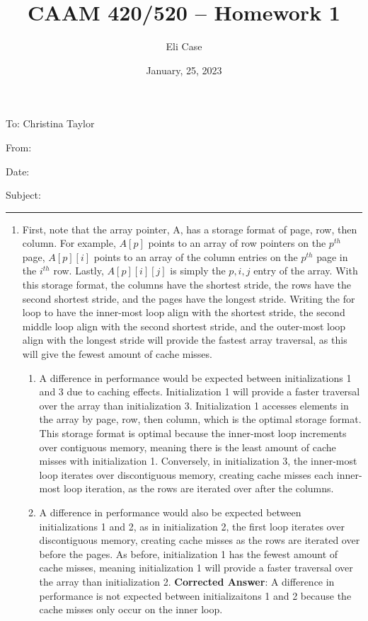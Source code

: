 \documentclass[11pt]{article}
\author{Eli Case}
\title{CAAM 420/520 -- Homework 1}
\date{January, 25, 2023}
\begin{document}
\flushleft
\thispagestyle{plain}
To: Christina Taylor

From: \@author

Date: \@date

Subject: \@title

\makeatother
\medskip
\hrule
\medskip

\begin{enumerate}[leftmargin=0.9in]
\item %

   First, note that the array pointer, A, has a storage format of page, row, then column. For example, $A[p]$ points to an array of row pointers on the $p^{th}$ page, $A[p][i]$ points to an array of the column entries on the $p^{th}$ page in the $i^{th}$ row. Lastly, $A[p][i][j]$ is simply the $p,i,j$ entry of the array. With this storage format, the columns have the shortest stride, the rows have the second shortest stride, and the pages have the longest stride. Writing the for loop to have the inner-most loop align with the shortest stride, the second middle loop align with the second shortest stride, and the outer-most loop align with the longest stride will provide the fastest array traversal, as this will give the fewest amount of cache misses.

   \begin{enumerate}[leftmargin=0.3in]

      \item A difference in performance would be expected between initializations 1 and 3 due to caching effects. Initialization 1 will provide a faster traversal over the array than initialization 3. Initialization 1 accesses elements in the array by page, row, then column, which is the optimal storage format. This storage format is optimal because the inner-most loop increments over contiguous memory, meaning there is the least amount of cache misses with initialization 1. Conversely, in initialization 3, the inner-most loop iterates over discontiguous memory, creating cache misses each inner-most loop iteration, as the rows are iterated over after the columns. 

      \item A difference in performance would also be expected between initializations 1 and 2, as in initialization 2, the first loop iterates over discontiguous memory, creating cache misses as the rows are iterated over before the pages. As before, initialization 1 has the fewest amount of cache misses, meaning initialization 1 will provide a faster traversal over the array than initialization 2. \newline \textbf{Corrected Answer}: A difference in performance is not expected between initializaitons 1 and 2 because the cache misses only occur on the inner loop. 


\end{enumerate}
\end{enumerate}
\end{document}
